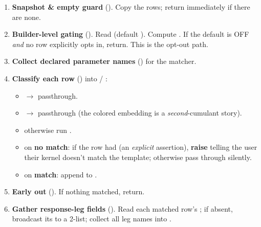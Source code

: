 \begin{enumerate}
  \item \textbf{Snapshot \& empty guard}
        (). Copy the rows;
        return immediately if there are none.

  \item \textbf{Builder-level gating}
        (). Read
         (default ).
        Compute .
        If the default is OFF \emph{and} no row explicitly opts in, return. This
        is the  opt-out path.

  \item \textbf{Collect declared parameter names}
        () for the matcher.

  \item \textbf{Classify each row}
        () into
         / :
        \begin{itemize}
          \item {} $\to$ passthrough.
          \item {} $\to$ passthrough (the colored embedding is a
                \emph{second}-cumulant story).
          \item otherwise run .
          \item on \textbf{no match}: if the row had 
                (an \emph{explicit} assertion), \textbf{raise }
                telling the user their kernel doesn't match the template;
                otherwise pass through silently.
          \item on \textbf{match}: append  to
                .
        \end{itemize}

  \item \textbf{Early out}
        (). If nothing matched,
        return.

  \item \textbf{Gather response-leg fields}
        (). Read each matched
        row's ; if absent, broadcast its
         to a 2-list; collect all leg names into
        .


\end{enumerate}
